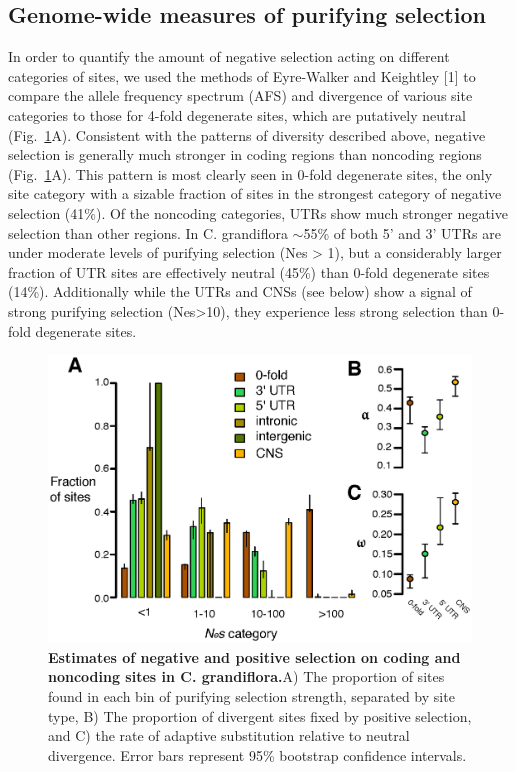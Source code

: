 \subsection{Genome-wide measures of purifying selection}
In order to quantify the amount of negative selection acting on different categories of sites, we used the methods of Eyre-Walker and Keightley [1] to compare the allele frequency spectrum (AFS) and divergence of various site categories to those for 4-fold degenerate sites, which are putatively neutral (Fig.~\ref{fig:fig1}A). Consistent with the patterns of diversity described above, negative selection is generally much stronger in coding regions than noncoding regions (Fig.~\ref{fig:fig1}A). This pattern is most clearly seen in 0-fold degenerate sites, the only site category with a sizable fraction of sites in the strongest category of negative selection (41\%). Of the noncoding categories, UTRs show much stronger negative selection than other regions. In C. grandiflora $\sim$55\% of both 5' and 3' UTRs are under moderate levels of purifying selection (Nes > 1), but a considerably larger fraction of UTR sites are effectively neutral (45\%) than 0-fold degenerate sites (14\%). Additionally while the UTRs and CNSs (see below) show a signal of strong purifying selection (Nes>10), they experience less strong selection than 0-fold degenerate sites. 

\begin{figure}[h]
      \centering
       \includegraphics[scale=0.8]{Ch2Fig1}
    \caption{\textbf{Estimates of negative and positive selection on coding and noncoding sites in C. grandiflora.}A) The proportion of sites found in each bin of purifying selection strength, separated by site type, B) The proportion of divergent sites fixed by positive selection, and C) the rate of adaptive substitution relative to neutral divergence. Error bars represent 95\% bootstrap confidence intervals.}
    \label{fig:fig1}
\end{figure}

